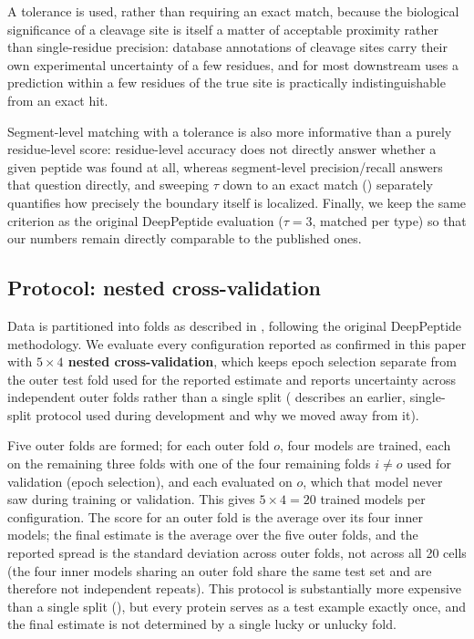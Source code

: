 \documentclass{article}
\begin{document}
A tolerance is used, rather than requiring an exact match, because the biological significance of a cleavage site is itself a matter of acceptable proximity rather than single-residue precision: database annotations of cleavage sites carry their own experimental uncertainty of a few residues, and for most downstream uses a prediction within a few residues of the true site is practically indistinguishable from an exact hit.

Segment-level matching with a tolerance is also more informative than a purely residue-level score: residue-level accuracy does not directly answer whether a given peptide was found at all, whereas segment-level precision/recall answers that question directly, and sweeping $\tau$ down to an exact match () separately quantifies how precisely the boundary itself is localized. Finally, we keep the same criterion as the original DeepPeptide evaluation ($\tau=3$, matched per type) so that our numbers remain directly comparable to the published ones.

\subsection{Protocol: nested cross-validation}
\label{sec:eval-protocol}

Data is partitioned into folds as described in , following the original DeepPeptide methodology. We evaluate every configuration reported as confirmed in this paper with \textbf{$5\times4$ nested cross-validation}, which keeps epoch selection separate from the outer test fold used for the reported estimate and reports uncertainty across independent outer folds rather than a single split ( describes an earlier, single-split protocol used during development and why we moved away from it).

Five outer folds are formed; for each outer fold $o$, four models are trained, each on the remaining three folds with one of the four remaining folds $i \ne o$ used for validation (epoch selection), and each evaluated on $o$, which that model never saw during training or validation. This gives $5\times4=20$ trained models per configuration. The score for an outer fold is the average over its four inner models; the final estimate is the average over the five outer folds, and the reported spread is the standard deviation across outer folds, not across all 20 cells (the four inner models sharing an outer fold share the same test set and are therefore not independent repeats). This protocol is substantially more expensive than a single split (), but every protein serves as a test example exactly once, and the final estimate is not determined by a single lucky or unlucky fold.
\end{document}
